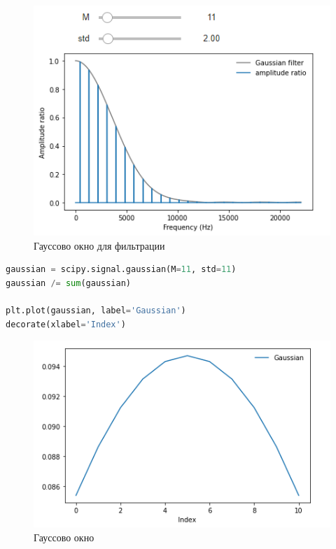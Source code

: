 \begin{figure}[H]
	\begin{center}
		\includegraphics[scale=1]{fig/lab08/lab08_01.png}
		\caption{Гауссово окно для фильтрации}
	\end{center}
\end{figure}

\begin{lstlisting}[language=Python]
gaussian = scipy.signal.gaussian(M=11, std=11)
gaussian /= sum(gaussian)

plt.plot(gaussian, label='Gaussian')
decorate(xlabel='Index')
\end{lstlisting}

\begin{figure}[H]
	\begin{center}
		\includegraphics[scale=0.7]{fig/lab08/lab08_02.png}
		\caption{Гауссово окно}
	\end{center}
\end{figure}

